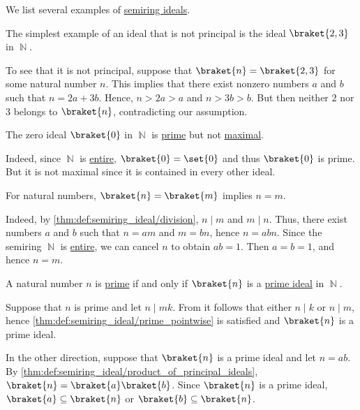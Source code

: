 \begin{example}\label{ex:def:semiring_ideal}
  We list several examples of \hyperref[def:semiring_ideal]{semiring ideals}.
  \begin{thmenum}
     The simplest example of an ideal that is not principal is the ideal \( \braket{ 2, 3 } \) in \( \BbbN \).

    To see that it is not principal, suppose that \( \braket{ n } = \braket{ 2, 3 } \) for some natural number \( n \). This implies that there exist nonzero numbers \( a \) and \( b \) such that \( n = 2a + 3b \). Hence, \( n > 2a > a \) and \( n > 3b > b \). But then neither \( 2 \) nor \( 3 \) belongs to \( \braket{ n } \), contradicting our assumption.

     The zero ideal \( \braket{ 0 } \) in \( \BbbN \) is \hyperref[def:semiring_ideal/prime]{prime} but not \hyperref[def:semiring_ideal/maximal]{maximal}.

    Indeed, since \( \BbbN \) is \hyperref[def:entire_semiring]{entire}, \( \braket{ 0 } = \set{ 0 } \) and thus \( \braket{ 0 } \) is prime. But it is not maximal since it is contained in every other ideal.

     For natural numbers, \( \braket{ n } = \braket{ m } \) implies \( n = m \).

    Indeed, by \cref{thm:def:semiring_ideal/division}, \( n \mid m \) and \( m \mid n \). Thus, there exist numbers \( a \) and \( b \) such that \( n = am \) and \( m = bn \), hence \( n = abn \). Since the semiring \( \BbbN \) is \hyperref[def:entire_semiring]{entire}, we can cancel \( n \) to obtain \( ab = 1 \). Then \( a = b = 1 \), and hence \( n = m \).

     A natural number \( n \) is \hyperref[def:prime_number]{prime} if and only if \( \braket{n} \) is a \hyperref[def:semiring_ideal/prime]{prime ideal} in \( \BbbN \).

    Suppose that \( n \) is prime and let \( n \mid mk \). From  it follows that either \( n \mid k \) or \( n \mid m \), hence \cref{thm:def:semiring_ideal/prime_pointwise} is satisfied and \( \braket{ n } \) is a prime ideal.

    In the other direction, suppose that \( \braket{ n } \) is a prime ideal and let \( n = ab \). By \cref{thm:def:semiring_ideal/product_of_principal_ideals}, \( \braket{ n } = \braket{ a } \braket{ b } \). Since \( \braket{ n } \) is a prime ideal, \( \braket{ a } \subseteq \braket{ n } \) or \( \braket{ b } \subseteq \braket{ n } \).


\end{thmenum}
\end{example}
